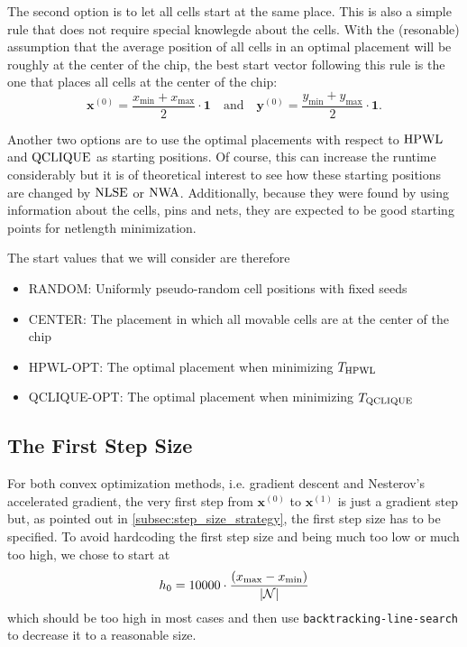 The second option is to let all cells start at the same place.
This is also a simple rule that does not require special knowlegde about the cells.
With the (resonable) assumption that the average position of all cells in an 
optimal placement will be roughly at the center of the chip,
the best start vector following this rule is the one that places all cells at the center of the chip:
\[ \mathbf{x}^{(0)} = \frac{x_{\min} + x_{\max}}{2} \cdot \mathbf{1} \quad \text{and} \quad \mathbf{y}^{(0)} = \frac{y_{\min} + y_{\max}}{2} \cdot \mathbf{1} . \]

Another two options are to use the optimal placements with respect to \(\operatorname{HPWL}\) and \(\operatorname{QCLIQUE}\) as starting positions.
Of course, this can increase the runtime considerably but it is of theoretical interest to see
how these starting positions are changed by \(\operatorname{NLSE}\) or \(\operatorname{NWA}\).
Additionally, because they were found by using information about the cells, pins and nets,
they are expected to be good starting points for netlength minimization.

The start values that we will consider are therefore
\begin{itemize}
 \item RANDOM: Uniformly pseudo-random cell positions with fixed seeds
 \item CENTER: The placement in which all movable cells are at the center of the chip
 \item HPWL-OPT: The optimal placement when minimizing \(T_{\operatorname{HPWL}}\)
 \item QCLIQUE-OPT: The optimal placement when minimizing \(T_{\operatorname{QCLIQUE}}\)
\end{itemize}


\subsection{The First Step Size} \label{subsec:implementation_first_step_size}

For both convex optimization methods, i.e. gradient descent and Nesterov's accelerated gradient,
the very first step from \(\mathbf{x}^{(0)}\) to \(\mathbf{x}^{(1)}\) is just a gradient step
but, as pointed out in \cref{subsec:step_size_strategy}, the first step size has to be specified.
To avoid hardcoding the first step size and being much too low or much too high, we chose to start at
\[ h_0 = 10000 \cdot \frac{(x_{\max} - x_{\min})}{\lvert\mathcal{N}\rvert} \]
which should be too high in most cases and then use \texttt{backtracking-line-search} to decrease it to a reasonable size.


